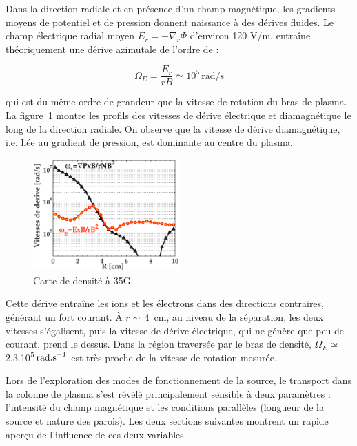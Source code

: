 \begin{refsection}
Dans la direction radiale et en présence d'un champ magnétique, les gradients
moyens de potentiel et de pression donnent naissance à des dérives
fluides. 
Le champ électrique radial moyen $E_r=-\nabla_r\Phi$ d'environ 120 V/m,
entraîne théoriquement une dérive azimutale de l'ordre de :

\begin{equation}
\Omega_E=\frac{E_r}{rB}\simeq10^5\,\text{rad/s} 
\end{equation}

qui est du même ordre de grandeur que la vitesse de rotation du bras de plasma.
La figure~\ref{4-CybeleVitessesDerive} montre les profils des vitesses
de dérive électrique et diamagnétique le long de la direction radiale. On
observe que la vitesse de dérive diamagnétique, i.e. liée au gradient de
pression, est dominante au centre du plasma. 

\begin{figure}[!htbp]
\centering
\includegraphics[width=0.5\textwidth]{figures/4-CybeleProfileVitessesDerive.eps}
{\caption{Carte de densité à 35G.}
\label{4-CybeleVitessesDerive}}
\end{figure}

Cette dérive entraîne les ions et les électrons dans des directions
contraires, générant un fort courant. À $r\sim\,$4~cm, au niveau de la
séparation, les deux vitesses s'égalisent, puis la vitesse de dérive électrique, qui ne
génère que peu de courant, prend le dessus. Dans la région traversée par le bras
de densité, $\Omega_E\simeq$ 2,3.10$^{{5}}\,\text{rad.s}^{{-1}}$
est très proche de la vitesse de rotation mesurée.

Lors de l'exploration des modes de fonctionnement de la source, le transport
dans la colonne de plasma s'est révélé principalement sensible à deux
paramètres : l'intensité du champ magnétique et les conditions parallèles 
(longueur de la source et nature des parois). Les deux sections suivantes
montrent un rapide aperçu de l'influence de ces deux variables.


\end{refsection}
